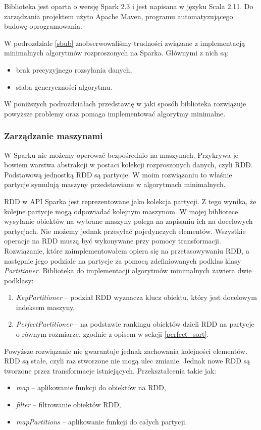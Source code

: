 \documentclass[magisterska]{pracamgr}
\begin{document}
Biblioteka jest oparta o wersję Spark 2.3 i jest napisana w języku Scala 2.11. Do zarządzania projektem użyto Apache Maven, programu automatyzującego budowę oprogramowania.

W podrozdziale \ref{sbub} zaobserwowaliśmy trudności związane z implementacją minimalnych algorytmów rozproszonych na Sparka. Głównymi z nich są:
\begin{itemize}
    \item brak precyzyjnego rozsyłania danych,
    \item słaba generyczności algorytmu.
\end{itemize}
W poniższych podrozdziałach przedstawię w jaki sposób biblioteka rozwiązuje powyższe problemy oraz pomaga implementować algorytmy minimalne.

\subsubsection{Zarządzanie maszynami} \label{spark_zarzadzanie_maszynami}

W Sparku nie możemy operować bezpośrednio na maszynach. Przykrywa je bowiem warstwa abstrakcji w postaci kolekcji rozproszonych danych, czyli RDD. Podstawową jednostką RDD są partycje. W moim rozwiązaniu to właśnie partycje symulują maszyny przedstawiane w algorytmach minimalnych.

RDD w API Sparka jest reprezentowane jako kolekcja partycji. Z tego wynika, że kolejne partycje mogą odpowiadać kolejnym maszynom. W mojej bibliotece wysyłanie obiektów na wybrane maszyny polega na zapisaniu ich na docelowych partycjach. Nie możemy jednak przesyłać pojedynczych elementów. Wszystkie operacje na RDD muszą być wykonywane przy pomocy transformacji. Rozwiązanie, które zaimplementowałem opiera się na przetasowywaniu RDD, a następnie jego podziale na partycje za pomocą zdefiniowanych podklas klasy \textit{Partitioner}. Biblioteka do implementacji algorytmów minimalnych zawiera dwie podklasy:
\begin{enumerate}
    \item \textit{KeyPartitioner} -- podział RDD wyznacza klucz obiektu, który jest docelowym indeksem maszyny,
    \item \textit{PerfectPartitioner} -- na podstawie rankingu obiektów dzieli RDD na partycje o równym rozmiarze, zgodnie z opisem w sekcji \ref{perfect_sort}.
\end{enumerate}

Powyższe rozwiązanie nie gwarantuje jednak zachowania kolejności elementów. RDD są stałe, czyli raz stworzone nie mogą ulec zmianie. Jednak nowe RDD są tworzone przez transformacje istniejących. Przekształcenia takie jak:
\begin{itemize}
    \item \textit{map} -- aplikowanie funkcji do obiektów na RDD,
    \item \textit{filter} -- filtrowanie obiektów RDD,
    \item \textit{mapPartitions} -- aplikowanie funkcji do całych partycji.
\end{itemize}
 
\end{document}
